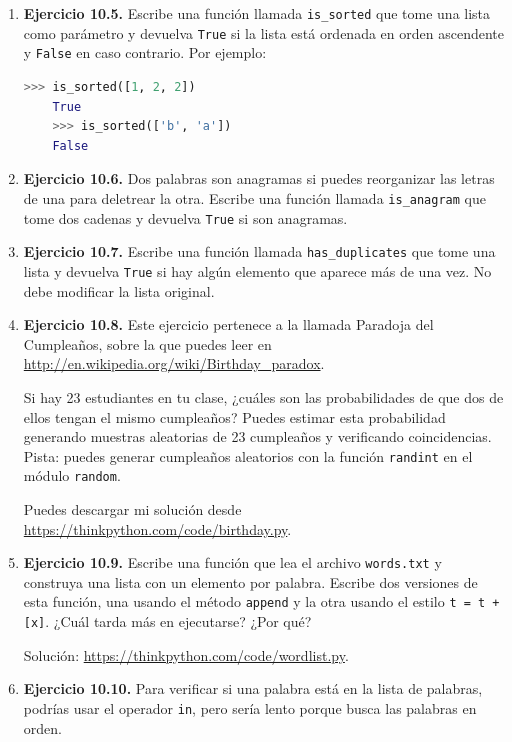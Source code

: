 \begin{enumerate}
    \item \textbf{Ejercicio 10.5.} Escribe una función llamada \texttt{is\_sorted} que tome una lista como parámetro y devuelva \texttt{True} si la lista está ordenada en orden ascendente y \texttt{False} en caso contrario. Por ejemplo:
    
    \begin{lstlisting}[language=Python]
    >>> is_sorted([1, 2, 2]) 
    True 
    >>> is_sorted(['b', 'a']) 
    False
    \end{lstlisting}
    
    \item \textbf{Ejercicio 10.6.} Dos palabras son anagramas si puedes reorganizar las letras de una para deletrear la otra. Escribe una función llamada \texttt{is\_anagram} que tome dos cadenas y devuelva \texttt{True} si son anagramas.
    
    \item \textbf{Ejercicio 10.7.} Escribe una función llamada \texttt{has\_duplicates} que tome una lista y devuelva \texttt{True} si hay algún elemento que aparece más de una vez. No debe modificar la lista original.
    
    \item \textbf{Ejercicio 10.8.} Este ejercicio pertenece a la llamada Paradoja del Cumpleaños, sobre la que puedes leer en \url{http://en.wikipedia.org/wiki/Birthday_paradox}.
    
    Si hay 23 estudiantes en tu clase, ¿cuáles son las probabilidades de que dos de ellos tengan el mismo cumpleaños? Puedes estimar esta probabilidad generando muestras aleatorias de 23 cumpleaños y verificando coincidencias. Pista: puedes generar cumpleaños aleatorios con la función \texttt{randint} en el módulo \texttt{random}.
    
    Puedes descargar mi solución desde \url{https://thinkpython.com/code/birthday.py}.
    
    \item \textbf{Ejercicio 10.9.} Escribe una función que lea el archivo \texttt{words.txt} y construya una lista con un elemento por palabra. Escribe dos versiones de esta función, una usando el método \texttt{append} y la otra usando el estilo \texttt{t = t + [x]}. ¿Cuál tarda más en ejecutarse? ¿Por qué?
    
    Solución: \url{https://thinkpython.com/code/wordlist.py}.
    
    \item \textbf{Ejercicio 10.10.} Para verificar si una palabra está en la lista de palabras, podrías usar el operador \texttt{in}, pero sería lento porque busca las palabras en orden.
    

\end{enumerate}
